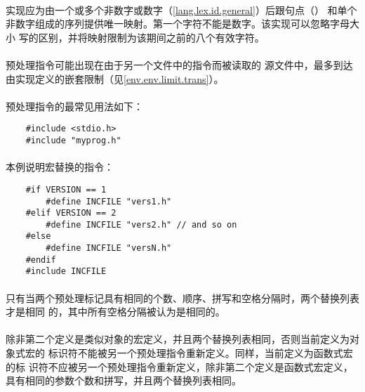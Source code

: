 {\paragraph{}
实现应为由一个或多个非数字或数字（\ref{lang.lex.id.general}）后跟句点（）
和单个非数字组成的序列提供唯一映射。第一个字符不能是数字。该实现可以忽略字母大小
写的区别，并将映射限制为该期间之前的八个有效字符。

\paragraph{}
预处理指令可能出现在由于另一个文件中的指令而被读取的
源文件中，最多到达由实现定义的嵌套限制（见\ref{env.env.limit.trans}）。

\paragraph{}
\ex {}预处理指令的最常见用法如下：
\begin{lstlisting}
    #include <stdio.h>
    #include "myprog.h"
\end{lstlisting}

\paragraph{}
\ex 本例说明宏替换的指令：
\begin{lstlisting}
    #if VERSION == 1
        #define INCFILE "vers1.h"
    #elif VERSION == 2
        #define INCFILE "vers2.h" // and so on
    #else
        #define INCFILE "versN.h"
    #endif
    #include INCFILE
\end{lstlisting}


\constraint
\paragraph{}
只有当两个预处理标记具有相同的个数、顺序、拼写和空格分隔时，两个替换列表才是相同
的，其中所有空格分隔被认为是相同的。

\paragraph{}
除非第二个定义是类似对象的宏定义，并且两个替换列表相同，否则当前定义为对象式宏的
标识符不能被另一个预处理指令重新定义。同样，当前定义为函数式宏的标
识符不应被另一个预处理指令重新定义，除非第二个定义是函数式宏定义，
具有相同的参数个数和拼写，并且两个替换列表相同。

}
